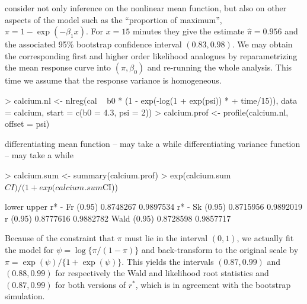 \documentclass[a4paper,11pt]{article}
\begin{document}
\citet[p.~356]{davison.hinkley:1997} consider not only inference on the nonlinear mean function, but also on other aspects of the model such as the ``proportion of maximum'', $\pi = 1-\exp(-\beta_1x)$.  For $x = 15$ minutes they give the estimate $\hat\pi = 0.956$ and the associated 95\% bootstrap confidence interval $(0.83,0.98)$.  We may obtain the corresponding first and higher order likelihood  analogues by reparametrizing the mean response curve into $(\pi,\beta_0)$ and re-running the whole analysis.  This time we assume that the response variance is homogeneous.  
%
\begin{Schunk}
\begin{Sinput}
> calcium.nl <- nlreg(cal ~ b0 * (1 - exp(-log(1 + exp(psi)) * 
+     time/15)), data = calcium, start = c(b0 = 4.3, psi = 2))
> calcium.prof <- profile(calcium.nl, offset = psi)
\end{Sinput}
\begin{Soutput}
differentiating mean function -- may take a while
differentiating variance function -- may take a while
\end{Soutput}
\begin{Sinput}
> calcium.sum <- summary(calcium.prof)
> exp(calcium.sum$CI)/(1 + exp(calcium.sum$CI))
\end{Sinput}
\begin{Soutput}
                   lower     upper
r* - Fr (0.95) 0.8748267 0.9897534
r* - Sk (0.95) 0.8715956 0.9892019
r (0.95)       0.8777616 0.9882782
Wald (0.95)    0.8728598 0.9857717
\end{Soutput}
\end{Schunk}
%
Because of the constraint that $\pi$ must lie in the interval $(0,1)$, we actually fit the model for $\psi = \log\{\pi/(1-\pi)\}$ and back-transform to the original scale by $\pi = \exp(\psi)/\{1+\exp(\psi)\}$.  This yields the intervals $(0.87,0.99)$ and $(0.88,0.99)$ for respectively the Wald and likelihood root statistics and $(0.87,0.99)$ for both versions of $r^*$, which is in agreement with the bootstrap simulation.  
\end{document}
